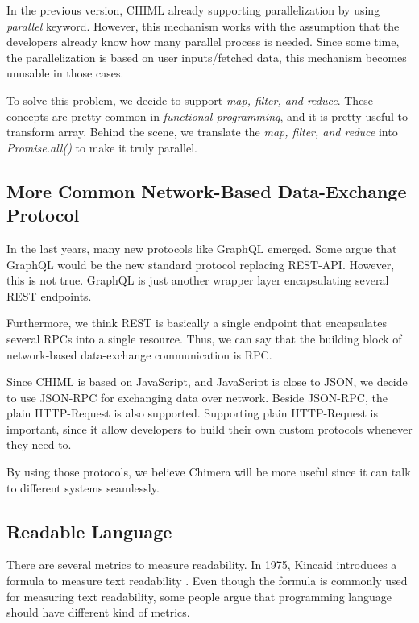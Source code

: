 \documentclass[conference]{IEEEtran}
\begin{document}
In the previous version, CHIML already supporting parallelization by using {\it parallel} keyword. However, this mechanism works with the assumption that the developers already know how many parallel process is needed. Since some time, the parallelization is based on user inputs/fetched data, this mechanism becomes unusable in those cases.

To solve this problem, we decide to support {\it map, filter, and reduce}. These concepts are pretty common in {\it functional programming}, and it is pretty useful to transform array. Behind the scene, we translate the {\it map, filter, and reduce} into {\it Promise.all()} to make it truly parallel.

\subsection{More Common Network-Based Data-Exchange Protocol}

In the last years, many new protocols like GraphQL emerged. Some argue that GraphQL would be the new standard protocol replacing REST-API. However, this is not true. GraphQL is just another wrapper layer encapsulating several REST endpoints.

Furthermore, we think REST is basically a single endpoint that encapsulates several RPCs into a single resource. Thus, we can say that the building block of network-based data-exchange communication is RPC.

Since CHIML is based on JavaScript, and JavaScript is close to JSON, we decide to use JSON-RPC for exchanging data over network. Beside JSON-RPC, the plain HTTP-Request is also supported. Supporting plain HTTP-Request is important, since it allow developers to build their own custom protocols whenever they need to.

By using those protocols, we believe Chimera will be more useful since it can talk to different systems seamlessly.

\subsection{Readable Language}

There are several metrics to measure readability. In 1975, Kincaid introduces a formula to measure text readability \cite{kincaid1975}. Even though the formula is commonly used for measuring text readability, some people argue that programming language should have different kind of metrics.
\end{document}
